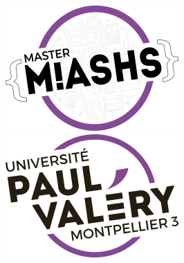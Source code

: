 \begin{titlepage}
\enlargethispage{2cm}
 

\begin{figure}[t]
\begin{minipage}[t]{0.2\linewidth}
\includegraphics[width=\linewidth]{img/logo-master-petit.png}
\end{minipage}
\hfill
\begin{minipage}[t]{0.2\linewidth}
\includegraphics[width=\linewidth]{img/logo-upv-petit.png}
\end{minipage}
\vspace{0pt}
\end{figure}

       
        
\begin{center}
        \vspace*{\fill}
        \textsc{\@title}
        \vspace*{0.5cm}
        
        \hrulefill\
        
        \large{\@author} 
        \vspace*{\fill}

    \end{center}
    \vspace*{4.2cm}

\end{titlepage}
\ClearShipoutPicture